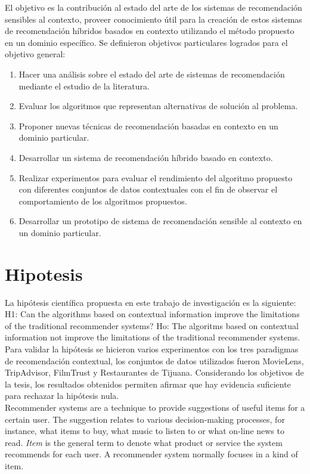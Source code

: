 El objetivo es la contribución al estado del arte de los sistemas de
recomendación sensibles al contexto, proveer conocimiento útil para la
creación de estos sistemas de recomendación híbridos basados en
contexto utilizando el método propuesto en un  dominio específico.  Se
definieron objetivos particulares logrados para el objetivo general: 
\begin{enumerate}
\item Hacer una análisis sobre el estado del arte de sistemas de
recomendación mediante el estudio de la literatura.  
\item Evaluar los algoritmos que representan alternativas de solución 
al problema.  
\item Proponer nuevas técnicas de recomendación basadas en contexto en un
dominio particular. 
\item Desarrollar un sistema de recomendación híbrido basado en contexto. 
\item Realizar experimentos para evaluar el rendimiento del algoritmo 
propuesto con diferentes conjuntos de datos contextuales con el fin 
de observar el comportamiento de los algoritmos propuestos. 
\item Desarrollar un prototipo de sistema de recomendación sensible 
al contexto en un dominio particular.
\end{enumerate}

\section{Hipotesis}

La hipótesis científica propuesta en este trabajo de investigación es
la siguiente:
H1: Can the algorithms based on contextual information improve the
limitations of the traditional recommender systems?
Ho: The algoritms based on contextual information not improve the
limitations of the traditional recommender systems.\\
Para validar la hipótesis se hicieron varios experimentos con los tres
paradigmas de recomendación contextual, los conjuntos de datos
utilizados fueron MovieLens, TripAdvisor,  FilmTrust  y  Restaurantes
de Tijuana.  Considerando los objetivos de la tesis, los resultados
obtenidos permiten afirmar que hay evidencia suficiente para rechazar
la hipótesis nula.\\
Recommender systems are a technique to provide suggestions of 
useful items for a certain user. The suggestion relates to various
decision-making processes, for instance, what items to buy, what music
to listen to or what on-line news to read. \textit{Item} is the general
term to denote what product or service the system recommends for each
user. A recommender system normally focuses in a kind of item\cite{resnick1997recommender}.

